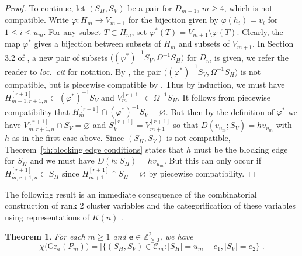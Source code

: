 \documentclass{amsart}
\newtheorem{theorem}{Theorem}[section]
\numberwithin{equation}{section}
\newcommand{\ZZ}{\mathbb{Z}}
\newcommand{\bfe}{\mathbf{e}}
\newcommand{\cC}{\mathcal{C}}
\newcommand{\Gr}{\mathrm{Gr}}
\begin{document}
\begin{proof}
  To continue, let $(S_H,S_V)$ be a pair for $D_{m+1}$, $m\ge4$, which is not compatible.
  Write $\varphi:H_m\to V_{m+1}$ for the bijection given by $\varphi(h_i)=v_i$ for $1\le i\le u_m$.
  For any subset $T\subset H_m$, set $\varphi^*(T)=V_{m+1}\setminus\varphi(T)$.
  Clearly, the map $\varphi^*$ gives a bijection between subsets of $H_m$ and subsets of $V_{m+1}$.
  In Section 3.2 of \cite{rupel}, a new pair of subsets $\big((\varphi^*)^{-1}S_V,\Omega^{-1}S_H\big)$ for $D_m$ is given, we refer the reader to \emph{loc.\ cit} for notation.
  By \cite[Proposition 3.10]{rupel}, the pair $\big((\varphi^*)^{-1}S_V,\Omega^{-1}S_H\big)$ is not compatible, but is piecewise compatible by \cite[Proposition 3.16]{rupel}.
  Thus by induction, we must have $H_{m-1,r+1,n}^{[r+1]}\subset(\varphi^*)^{-1}S_V$ and $V_m^{[r+1]}\subset\Omega^{-1}S_H$.
  It follows from piecewise compatibility that $H_m^{[r+1]}\cap(\varphi^*)^{-1}S_V=\varnothing$.
  But then by the definition of $\varphi^*$ we have $V_{m,r+1,n}^{[r+1]}\cap S_V=\varnothing$ and $S_V^{[r+1]}=V_{m+1}^{[r+1]}$ so that $D(v_{u_m};S_V)=hv_{u_m}$ with $h$ as in the first case above.
  Since $(S_H,S_V)$ is not compatible, Theorem~\ref{th:blocking edge conditions} states that $h$ must be the blocking edge for $S_H$ and we must have $D(h;S_H)=hv_{u_m}$.
  But this can only occur if $H_{m,r+1,n}^{[r+1]}\subset S_H$ since $H_{m+1}^{[r+1]}\cap S_H=\varnothing$ by piecewise compatibility.
\end{proof}

The following result is an immediate consequence of the combinatorial construction of rank 2 cluster variables \cite{llz} and the categorification of these variables using representations of $K(n)$ \cite{cc,ck}.
\begin{theorem}
  \label{th:combinatorial euler}
  \cite{llz}
  For each $m\ge1$ and $\bfe\in\ZZ_{\ge0}^2$, we have 
  \[\chi\big(\Gr_\bfe(P_m)\big)=\Big|\big\{(S_H,S_V)\in\cC_m:|S_H|=u_m-e_1,|S_V|=e_2\big\}\Big|.\]
\end{theorem}
\end{document}
